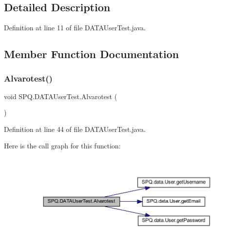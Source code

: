\subsection{Detailed Description}


Definition at line 11 of file D\+A\+T\+A\+User\+Test.\+java.



\subsection{Member Function Documentation}
\mbox{\label{class_s_p_q_1_1_d_a_t_a_user_test_a9d47696cb1887a6d5712f0e9beae2182}} 
\subsubsection{\texorpdfstring{Alvarotest()}{Alvarotest()}}
{\footnotesize\ttfamily void S\+P\+Q.\+D\+A\+T\+A\+User\+Test.\+Alvarotest (\begin{DoxyParamCaption}{ }\end{DoxyParamCaption})}



Definition at line 44 of file D\+A\+T\+A\+User\+Test.\+java.

Here is the call graph for this function\+:\nopagebreak
\begin{figure}[H]
\begin{center}
\leavevmode
\includegraphics[width=350pt]{class_s_p_q_1_1_d_a_t_a_user_test_a9d47696cb1887a6d5712f0e9beae2182_cgraph}
\end{center}
\end{figure}
\mbox{\label{class_s_p_q_1_1_d_a_t_a_user_test_a7defc94d9391e6721dee5c627f75e1fb}} 
